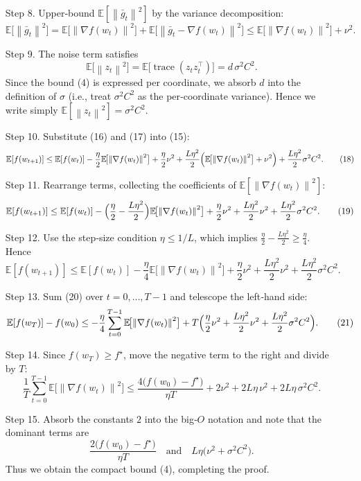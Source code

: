 \documentclass{article}
\newcommand{\E}{\mathbb{E}}
\newcommand{\norm}[1]{\left\|#1\right\|}
\newcommand{\grad}{\nabla}
\newcommand{\sig}{\sigma}
\begin{document}
\begin{enumerate}
\item[Step 8.] Upper‑bound $\E[\norm{\bar g_t}^2]$ by the variance decomposition:
\[
\E\!\bigl[\norm{\bar g_t}^2\bigr]
=\E\!\bigl[\norm{\grad f(w_t)}^2\bigr]
+\E\!\bigl[\norm{\bar g_t-\grad f(w_t)}^2\bigr]
\le \E\!\bigl[\norm{\grad f(w_t)}^2\bigr]+\nu^2.
\tag{16}
\]

\item[Step 9.] The noise term satisfies
\[
\E\!\bigl[\norm{z_t}^2\bigr]
=\E\!\bigl[\operatorname{trace}(z_tz_t^\top)\bigr]
= d\,\sig^2 C^{2}.
\tag{17}
\]
Since the bound (4) is expressed per coordinate, we absorb $d$ into the definition of $\sig$ (i.e., treat $\sig^2 C^2$ as the per‑coordinate variance). Hence we write simply $\E[\norm{z_t}^2]=\sig^2 C^2$.

\item[Step 10.] Substitute (16) and (17) into (15):
\[
\E[f(w_{t+1})]
\le \E[f(w_t)]
-\frac{\eta}{2}\E\!\bigl[\norm{\grad f(w_t)}^2\bigr]
+\frac{\eta}{2}\nu^2
+\frac{L\eta^2}{2}\Bigl(\E\!\bigl[\norm{\grad f(w_t)}^2\bigr]+\nu^2\Bigr)
+\frac{L\eta^2}{2}\sig^2 C^{2}.
\tag{18}
\]

\item[Step 11.] Rearrange terms, collecting the coefficients of $\E[\norm{\grad f(w_t)}^2]$:
\[
\E[f(w_{t+1})]
\le \E[f(w_t)]
-\Bigl(\frac{\eta}{2}-\frac{L\eta^2}{2}\Bigr)
\E\!\bigl[\norm{\grad f(w_t)}^2\bigr]
+\frac{\eta}{2}\nu^2
+\frac{L\eta^2}{2}\nu^2
+\frac{L\eta^2}{2}\sig^2 C^{2}.
\tag{19}
\]

\item[Step 12.] Use the step‑size condition $\eta\le 1/L$, which implies $\frac{\eta}{2}-\frac{L\eta^2}{2}\ge \frac{\eta}{4}$. Hence
\[
\E[f(w_{t+1})]
\le \E[f(w_t)]
-\frac{\eta}{4}\E\!\bigl[\norm{\grad f(w_t)}^2\bigr]
+\frac{\eta}{2}\nu^2
+\frac{L\eta^2}{2}\nu^2
+\frac{L\eta^2}{2}\sig^2 C^{2}.
\tag{20}
\]

\item[Step 13.] Sum (20) over $t=0,\dots,T-1$ and telescope the left‑hand side:
\[
\E[f(w_T)]-f(w_0)
\le -\frac{\eta}{4}\sum_{t=0}^{T-1}\E\!\bigl[\norm{\grad f(w_t)}^2\bigr]
+T\Bigl(\frac{\eta}{2}\nu^2
+\frac{L\eta^2}{2}\nu^2
+\frac{L\eta^2}{2}\sig^2 C^{2}\Bigr).
\tag{21}
\]

\item[Step 14.] Since $f(w_T)\ge f^\star$, move the negative term to the right and divide by $T$:
\[
\frac{1}{T}\sum_{t=0}^{T-1}\E\!\bigl[\norm{\grad f(w_t)}^2\bigr]
\le
\frac{4\bigl(f(w_0)-f^\star\bigr)}{\eta T}
+2\nu^2
+2L\eta\,\nu^2
+2L\eta\,\sig^2 C^{2}.
\tag{22}
\]

\item[Step 15.] Absorb the constants $2$ into the big‑$O$ notation and note that the dominant terms are
\[
\frac{2\bigl(f(w_0)-f^\star\bigr)}{\eta T}
\quad\text{and}\quad
L\eta\bigl(\nu^2+\sig^2 C^{2}\bigr).
\]
Thus we obtain the compact bound (4), completing the proof.
\qedhere
\end{enumerate}
\end{document}

